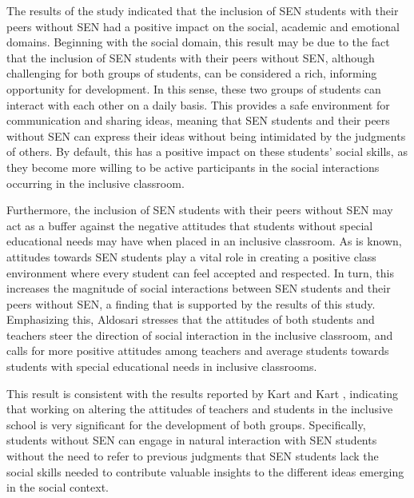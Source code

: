 \documentclass[10pt]{NSP1}
\begin{document}
	The results of the study indicated that the inclusion of SEN students with their peers without SEN had a positive impact on the social, academic and emotional domains. Beginning with the social domain, this result may be due to the fact that the inclusion of SEN students with their peers without SEN, although challenging for both groups of students, can be considered a rich, informing opportunity for development. In this sense, these two groups of students can interact with each other on a daily basis. This provides a safe environment for communication and sharing ideas, meaning that SEN students and their peers without SEN can express their ideas without being intimidated by the judgments of others. By default, this has a positive impact on these students' social skills, as they become more willing to be active participants in the social interactions occurring in the inclusive classroom.

	Furthermore, the inclusion of SEN students with their peers without SEN may act as a buffer against the negative attitudes that students without special educational needs may have when placed in an inclusive classroom. As is known, attitudes towards SEN students play a vital role in creating a positive class environment where every student can feel accepted and respected. In turn, this increases the magnitude of social interactions between SEN students and their peers without SEN, a finding that is supported by the results of this study. Emphasizing this, Aldosari \cite{ref10} stresses that the attitudes of both students and teachers steer the direction of social interaction in the inclusive classroom, and calls for more positive attitudes among teachers and average students towards students with special educational needs in inclusive classrooms.

	This result is consistent with the results reported by Kart and Kart \cite{ref26}, indicating that working on altering the attitudes of teachers and students in the inclusive school is very significant for the development of both groups. Specifically, students without SEN can engage in natural interaction with SEN students without the need to refer to previous judgments that SEN students lack the social skills needed to contribute valuable insights to the different ideas emerging in the social context.
\end{document}

